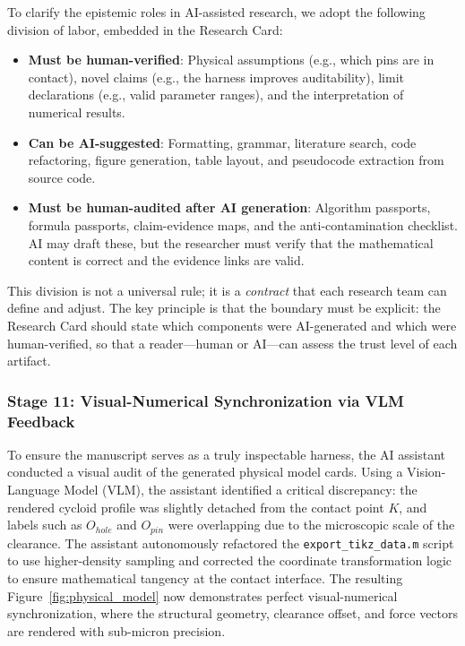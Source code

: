 \documentclass{article}
\begin{document}
To clarify the epistemic roles in AI-assisted research, we adopt the following division of labor, embedded in the Research Card:

\begin{itemize}
    \item \textbf{Must be human-verified}: Physical assumptions (e.g., which pins are in contact), novel claims (e.g., the harness improves auditability), limit declarations (e.g., valid parameter ranges), and the interpretation of numerical results.
    \item \textbf{Can be AI-suggested}: Formatting, grammar, literature search, code refactoring, figure generation, table layout, and pseudocode extraction from source code.
    \item \textbf{Must be human-audited after AI generation}: Algorithm passports, formula passports, claim-evidence maps, and the anti-contamination checklist. AI may draft these, but the researcher must verify that the mathematical content is correct and the evidence links are valid.
\end{itemize}

This division is not a universal rule; it is a \emph{contract} that each research team can define and adjust. The key principle is that the boundary must be explicit: the Research Card should state which components were AI-generated and which were human-verified, so that a reader---human or AI---can assess the trust level of each artifact.

\subsubsection{Stage 11: Visual-Numerical Synchronization via VLM Feedback}
To ensure the manuscript serves as a truly inspectable harness, the AI assistant conducted a visual audit of the generated physical model cards. Using a Vision-Language Model (VLM), the assistant identified a critical discrepancy: the rendered cycloid profile was slightly detached from the contact point $K$, and labels such as $O_{hole}$ and $O_{pin}$ were overlapping due to the microscopic scale of the clearance. The assistant autonomously refactored the \texttt{export\_tikz\_data.m} script to use higher-density sampling and corrected the coordinate transformation logic to ensure mathematical tangency at the contact interface. The resulting Figure~\ref{fig:physical_model} now demonstrates perfect visual-numerical synchronization, where the structural geometry, clearance offset, and force vectors are rendered with sub-micron precision.
\end{document}
